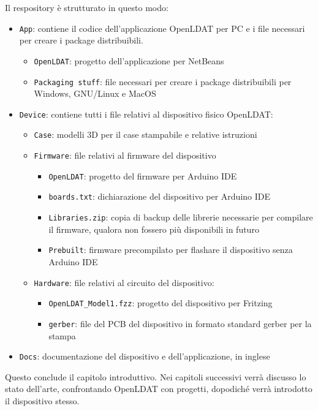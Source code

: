 Il respository è strutturato in questo modo:\begin{itemize}
	\item \texttt{App}: contiene il codice dell'applicazione OpenLDAT per PC e i file necessari per creare i package distribuibili. \begin{itemize}
		\item \texttt{OpenLDAT}: progetto dell'applicazione per NetBeans
		\item \texttt{Packaging stuff}: file necessari per creare i package distribuibili per Windows, GNU/Linux e MacOS
	\end{itemize}
	\item \texttt{Device}: contiene tutti i file relativi al dispositivo fisico OpenLDAT: \begin{itemize}
		\item \texttt{Case}: modelli 3D per il case stampabile e relative istruzioni
		\item \texttt{Firmware}: file relativi al firmware del dispositivo \begin{itemize}
			\item \texttt{OpenLDAT}: progetto del firmware per Arduino IDE
			\item \texttt{boards.txt}: dichiarazione del dispositivo per Arduino IDE
			\item \texttt{Libraries.zip}: copia di backup delle librerie necessarie per compilare il firmware, qualora non fossero più disponibili in futuro
			\item \texttt{Prebuilt}: firmware precompilato per flashare il dispositivo senza Arduino IDE
		\end{itemize}
		\item \texttt{Hardware}: file relativi al circuito del dispositivo: \begin{itemize}
			\item \texttt{OpenLDAT\_Model1.fzz}: progetto del dispositivo per Fritzing
			\item \texttt{gerber}: file del PCB del dispositivo in formato standard gerber per la stampa
		\end{itemize}
	\end{itemize}
	\item \texttt{Docs}: documentazione del dispositivo e dell'applicazione, in inglese
\end{itemize}

Questo conclude il capitolo introduttivo. Nei capitoli successivi verrà discusso lo stato dell'arte, confrontando OpenLDAT con progetti, dopodiché verrà introdotto il dispositivo stesso.


